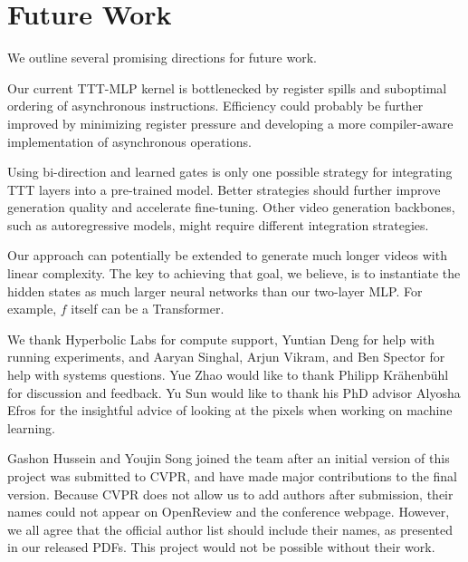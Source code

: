 \section{Future Work}
\label{sec:conclusion}

We outline several promising directions for future work.

Our current TTT-MLP kernel is bottlenecked by register spills and suboptimal ordering of asynchronous instructions. Efficiency could probably be further improved by minimizing register pressure and developing a more compiler-aware implementation of asynchronous operations.

 Using bi-direction and learned gates is only one possible strategy for integrating TTT layers into a pre-trained model. Better strategies should further improve generation quality and accelerate fine-tuning. 
Other video generation backbones, such as autoregressive models, might require different integration strategies.

Our approach can potentially be extended to generate much longer videos with linear complexity.
The key to achieving that goal, we believe, is to instantiate the hidden states as much larger neural networks than our two-layer MLP.
For example, $f$ itself can be a Transformer.

\vspace{4ex}
 We thank Hyperbolic Labs for compute support, Yuntian Deng for help with running experiments, and Aaryan Singhal, Arjun Vikram, and Ben Spector for help with systems questions.
Yue Zhao would like to thank Philipp Krähenbühl for discussion and feedback.
Yu Sun would like to thank his PhD advisor Alyosha Efros for the insightful advice of looking at the pixels when working on machine learning.

Gashon Hussein and Youjin Song joined the team after an initial version of this project was submitted to CVPR, and have made major contributions to the final version.
Because CVPR does not allow us to add authors after submission, their names could not appear on OpenReview and the conference webpage.
However, we all agree that the official author list should include their names, as presented in our released PDFs.
This project would not be possible without their work.